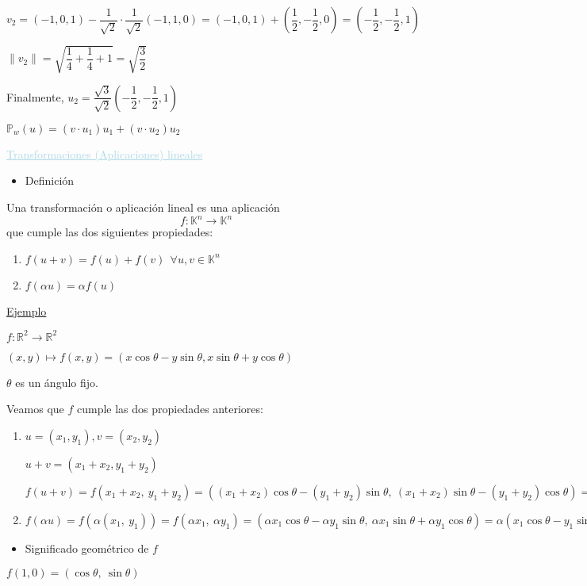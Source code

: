 \documentclass[12pt]{article}
\begin{document}
$v_2=(-1,0,1)-\dfrac{1}{\sqrt{2}}\cdot\dfrac{1}{\sqrt{2}}(-1,1,0)=(-1,0,1)+\left(\dfrac{1}{2},-\dfrac{1}{2},0\right)=\left(-\dfrac{1}{2},-\dfrac{1}{2},1\right)$

$\|v_2\|=\sqrt{\dfrac{1}{4}+\dfrac{1}{4}+1}=\sqrt{\dfrac{3}{2}}$

Finalmente, $u_2=\dfrac{\sqrt{3}}{\sqrt{2}}\left(-\dfrac{1}{2},-\dfrac{1}{2},1\right)$

$\mathbb{P}_w(u)=(v\cdot u_1)u_1+(v\cdot u_2)u_2$

\textcolor{lightblue}{\underline{Transformaciones (Aplicaciones) lineales}}
\begin{itemize}[label=\color{red}\textbullet, leftmargin=*]
    \item \color{lightblue} Definición
\end{itemize}
Una transformación o aplicación lineal es una aplicación \[f:\mathbb{K}^n\longrightarrow\mathbb{K}^n\] que cumple las dos siguientes propiedades: 
\begin{enumerate}[label=\arabic*)]
\item $f(u+v)=f(u)+f(v)~~\forall u,v\in\mathbb{K}^n$
\item $f(\alpha u)=\alpha f(u)$
\end{enumerate}
\underline{Ejemplo}

$f:\mathbb{R}^2\longrightarrow\mathbb{R}^2$

$(x,y)\longmapsto f(x,y)=(x\cos\theta-y\sin\theta, x\sin\theta+y\cos\theta)$

$\theta$ es un ángulo fijo.

Veamos que $f$ cumple las dos propiedades anteriores:
\begin{enumerate}[label=\arabic*)]
\item $u=(x_1,y_1),v=(x_2,y_2)$

$u+v=(x_1+x_2,y_1+y_2)$

$f(u+v)=f(x_1+x_2,~y_1+y_2)=\left((x_1+x_2)\cos\theta-(y_1+y_2)\sin\theta,~(x_1+x_2)\sin\theta-(y_1+y_2)\cos\theta\right)=(x_1\cos\theta-y_1\sin\theta,~x_1\sin\theta+y_1\cos\theta)+(x_2\cos\theta-y_2\sin\theta,~x_2\sin\theta+y_2\cos\theta)=f(u)+f(v)$
\item $f(\alpha u)=f\left(\alpha(x_1,~y_1)\right)=f(\alpha x_1,~\alpha y_1)=(\alpha x_1\cos\theta-\alpha y_1\sin\theta,~\alpha x_1\sin\theta+\alpha y_1\cos\theta)=\alpha(x_1\cos\theta-y_1\sin\theta,~x_1\sin\theta+y_1\cos\theta)=\alpha f(u)$
\end{enumerate}
\begin{itemize}[label=\color{red}\textbullet, leftmargin=*]
    \item \color{lightblue} Significado geométrico de $f$
\end{itemize}
$f(1,0)=(\cos\theta,~\sin\theta)$
\end{document}
